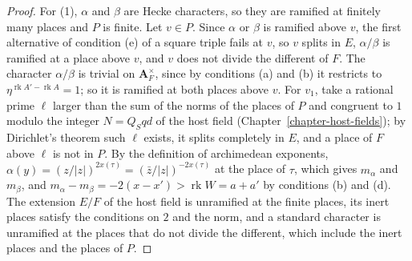 \begin{proof}
For (1), $\alpha$ and $\beta$ are Hecke characters, so they are ramified at
finitely many places and $P$ is finite. Let $v\in P$. Since $\alpha$ or
$\beta$ is ramified above $v$, the first alternative of condition (e) of a
square triple fails at $v$, so $v$ splits in $E$, $\alpha/\beta$ is ramified
at a place above $v$, and $v$ does not divide the different of $F$. The
character $\alpha/\beta$ is trivial on $\mathbf A_F^\times$, since by
conditions (a) and (b) it restricts to
$\eta^{\operatorname{rk}A'-\operatorname{rk}A}=1$; so it is ramified at both
places above $v$. For $v_1$, take a rational prime $\ell$ larger than the sum
of the norms of the places of $P$ and congruent to $1$ modulo the integer
$N=Q_Sqd$ of the host field (Chapter~\ref{chapter-host-fields}); by
Dirichlet's theorem such $\ell$ exists, it splits completely in $E$, and a
place of $F$ above $\ell$ is not in $P$. By the definition of archimedean exponents, $\alpha(y)=(z/|z|)^{2x(\tau)}
=(\bar z/|z|)^{-2x(\tau)}$ at the place of $\tau$, which gives $m_\alpha$ and
$m_\beta$, and $m_\alpha-m_\beta=-2(x-x')>\operatorname{rk}W=a+a'$ by
conditions (b) and (d). The extension $E/F$ of the host field is unramified at
the finite places, its inert places satisfy the conditions on $2$ and the
norm, and a standard character is unramified at the places that do not
divide the different, which include the inert places and the places of $P$.


\end{proof}
